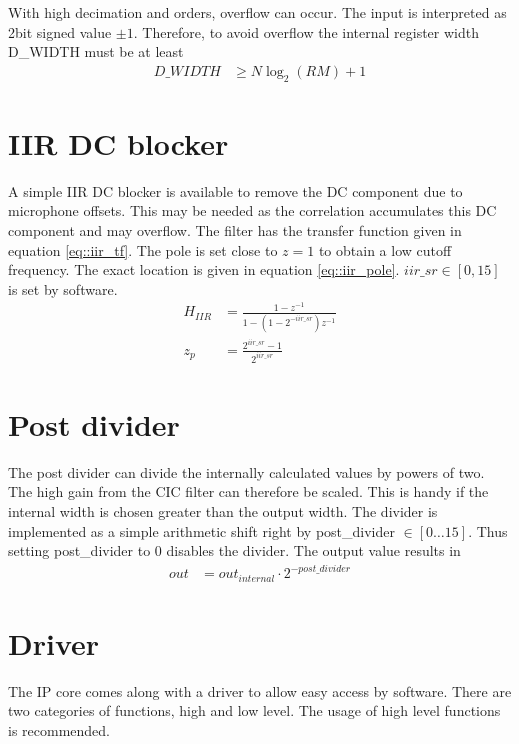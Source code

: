 With high decimation and orders, overflow can occur.
The input is interpreted as 2bit signed value $\pm1$. 
Therefore, to avoid overflow the internal register width D\_WIDTH must be at least
\begin{align}
D\_WIDTH &\ge N\log_2{(RM)} + 1 \label{eq::cic_width}
\end{align}

\section{IIR DC blocker}
\label{sec::iir}
A simple IIR DC blocker is available to remove the DC component due to microphone offsets.
This may be needed as the correlation accumulates this DC component and may overflow.
The filter has the transfer function given in equation \ref{eq::iir_tf}.
The pole is set close to $z=1$ to obtain a low cutoff frequency.
The exact location is given in equation \ref{eq::iir_pole}.
$iir\_sr\in\left[0,15\right]$ is set by software.
\begin{align}
	H_{IIR} &= \frac{1-z^{-1}}{1-\left(1-2^{-iir\_sr}\right)z^{-1}} \label{eq::iir_tf}\\
	z_p &= \frac{2^{iir\_sr}-1}{2^{iir\_sr}} \label{eq::iir_pole}
\end{align}

\section{Post divider}
\label{sec::post_divider}

The post divider can divide the internally calculated values by powers of two.
The high gain from the CIC filter can therefore be scaled.
This is handy if the internal width is chosen greater than the output width.
The divider is implemented as a simple arithmetic shift right by post\_divider $\in\left[0\ldots15\right]$.
Thus setting post\_divider to 0 disables the divider.
The output value results in
\begin{align}
	out &= out_{internal}\cdot2^{-post\_divider}
\end{align}

\section{Driver}
\label{sec::driver}

The IP core comes along with a driver to allow easy access by software.
There are two categories of functions, high and low level.
The usage of high level functions is recommended.

